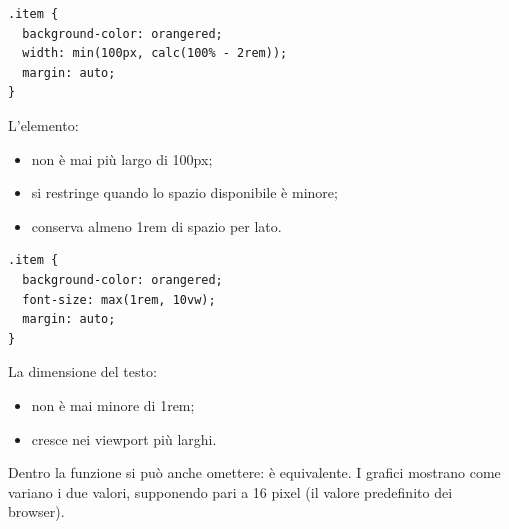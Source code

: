 \begin{affianco}[0.5][t]
\begin{lstlisting}[style=css, name=min.css]
.item {
  background-color: orangered;
  width: min(100px, calc(100% - 2rem));
  margin: auto;
}
\end{lstlisting}
L'elemento:
\begin{itemize}
  \item non è mai più largo di 100px;
  \item si restringe quando lo spazio disponibile è minore;
  \item conserva almeno 1rem di spazio per lato.
\end{itemize}
\risultato
\begin{lstlisting}[style=css, name=max.css]
.item {
  background-color: orangered;
  font-size: max(1rem, 10vw);
  margin: auto;
}
\end{lstlisting}
La dimensione del testo:
\begin{itemize}
  \item non è mai minore di 1rem;
  \item cresce nei viewport più larghi.
\end{itemize}
\end{affianco}

Dentro  la funzione  si può anche omettere:
 è equivalente. I grafici mostrano come variano
i due valori, supponendo  pari a 16 pixel (il valore predefinito dei
browser).

